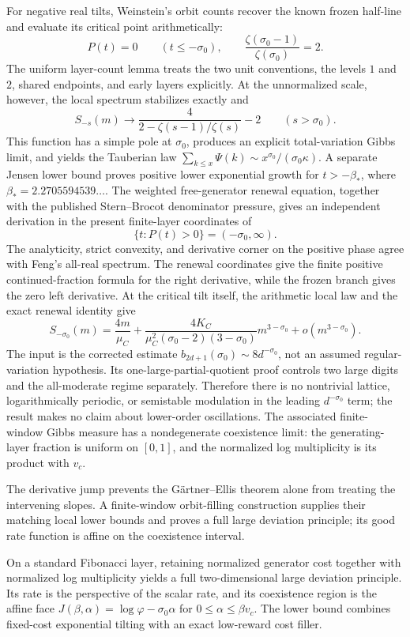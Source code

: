 For negative real tilts, Weinstein's orbit counts recover the known frozen
half-line and evaluate its critical point arithmetically:
\[
 P(t)=0\qquad(t\le-\sigma_0),
 \qquad
 \frac{\zeta(\sigma_0-1)}{\zeta(\sigma_0)}=2.
\]
The uniform layer-count lemma treats the two unit conventions, the levels
\(1\) and \(2\), shared endpoints, and early layers explicitly.
At the unnormalized scale, however, the local spectrum stabilizes exactly and
\[
 S_{-s}(m)\longrightarrow
 \frac4{2-\zeta(s-1)/\zeta(s)}-2
 \qquad(s>\sigma_0).
\]
This function has a simple pole at \(\sigma_0\), produces an explicit
total-variation Gibbs limit, and yields the Tauberian law
\(\sum_{k\le x}\Psi(k)\sim
x^{\sigma_0}/(\sigma_0\kappa)\).  A separate Jensen lower bound proves
positive lower exponential growth for \(t>-\beta_*\), where
  \(\beta_*=2.2705594539\ldots\).  The weighted free-generator renewal equation,
together with the published Stern--Brocot denominator pressure, gives an
independent derivation in the present finite-layer coordinates of
\[
 \{t:P(t)>0\}=(-\sigma_0,\infty).
\]
The analyticity, strict convexity, and derivative corner on the positive
phase agree with Feng's all-real spectrum.  The renewal coordinates give the
finite positive continued-fraction formula for the right derivative, while
the frozen branch gives the zero left derivative.
At the critical tilt itself, the arithmetic local law and the exact renewal
identity give
\[
 S_{-\sigma_0}(m)
 =\frac{4m}{\mu_C}
 +\frac{4K_C}{\mu_C^2(\sigma_0-2)(3-\sigma_0)}m^{3-\sigma_0}
 +o(m^{3-\sigma_0}).
\]
The input is the corrected estimate
\(b_{2d+1}(\sigma_0)\sim8d^{-\sigma_0}\), not an assumed regular-variation
hypothesis.  Its one-large-partial-quotient proof controls two large digits
and the all-moderate regime separately.  Therefore there is no nontrivial
lattice, logarithmically periodic, or semistable modulation in the leading
\(d^{-\sigma_0}\) term; the result makes no claim about lower-order
oscillations.
The associated finite-window Gibbs measure has a nondegenerate coexistence
limit: the generating-layer fraction is uniform on \([0,1]\), and the
normalized log multiplicity is its product with \(v_c\).

The derivative jump prevents the G\"artner--Ellis theorem alone from treating
the intervening slopes.  A finite-window orbit-filling construction supplies
their matching local lower bounds and proves a full large deviation principle;
its good rate function is affine on the coexistence interval.

On a standard Fibonacci layer, retaining normalized generator cost together
with normalized log multiplicity yields a full two-dimensional large
deviation principle.  Its rate is the perspective of the scalar rate, and its
coexistence region is the affine face
\(J(\beta,\alpha)=\log\varphi-\sigma_0\alpha\) for
\(0\le\alpha\le\beta v_c\).  The lower bound combines fixed-cost exponential
tilting with an exact low-reward cost filler.

